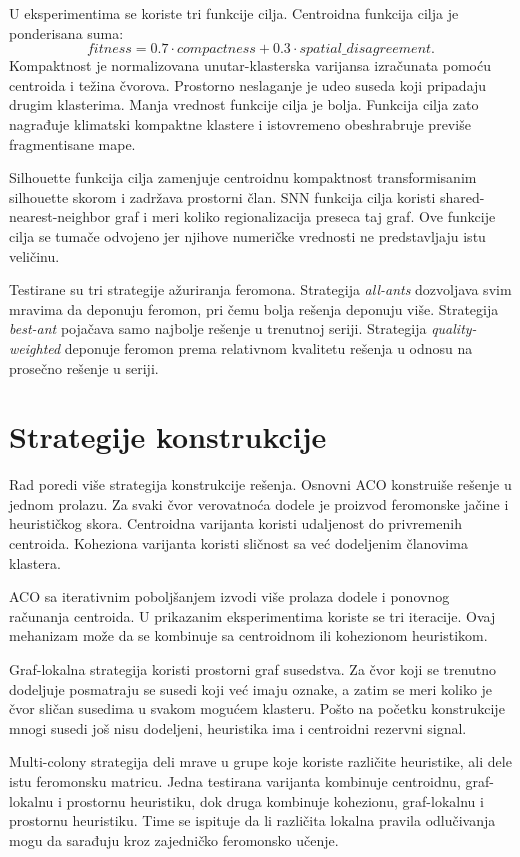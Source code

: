 \documentclass[11pt]{article}
\begin{document}
U eksperimentima se koriste tri funkcije cilja. Centroidna funkcija cilja je ponderisana suma:
\[
fitness = 0.7 \cdot compactness + 0.3 \cdot spatial\_disagreement.
\]
Kompaktnost je normalizovana unutar-klasterska varijansa izračunata pomoću centroida i težina čvorova. Prostorno neslaganje je udeo suseda koji pripadaju drugim klasterima. Manja vrednost funkcije cilja je bolja. Funkcija cilja zato nagrađuje klimatski kompaktne klastere i istovremeno obeshrabruje previše fragmentisane mape.

Silhouette funkcija cilja zamenjuje centroidnu kompaktnost transformisanim silhouette skorom i zadržava prostorni član. SNN funkcija cilja koristi shared-nearest-neighbor graf i meri koliko regionalizacija preseca taj graf. Ove funkcije cilja se tumače odvojeno jer njihove numeričke vrednosti ne predstavljaju istu veličinu.

Testirane su tri strategije ažuriranja feromona. Strategija \textit{all-ants} dozvoljava svim mravima da deponuju feromon, pri čemu bolja rešenja deponuju više. Strategija \textit{best-ant} pojačava samo najbolje rešenje u trenutnoj seriji. Strategija \textit{quality-weighted} deponuje feromon prema relativnom kvalitetu rešenja u odnosu na prosečno rešenje u seriji.

\section*{Strategije konstrukcije}

Rad poredi više strategija konstrukcije rešenja. Osnovni ACO konstruiše rešenje u jednom prolazu. Za svaki čvor verovatnoća dodele je proizvod feromonske jačine i heurističkog skora. Centroidna varijanta koristi udaljenost do privremenih centroida. Koheziona varijanta koristi sličnost sa već dodeljenim članovima klastera.

ACO sa iterativnim poboljšanjem izvodi više prolaza dodele i ponovnog računanja centroida. U prikazanim eksperimentima koriste se tri iteracije. Ovaj mehanizam može da se kombinuje sa centroidnom ili kohezionom heuristikom.

Graf-lokalna strategija koristi prostorni graf susedstva. Za čvor koji se trenutno dodeljuje posmatraju se susedi koji već imaju oznake, a zatim se meri koliko je čvor sličan susedima u svakom mogućem klasteru. Pošto na početku konstrukcije mnogi susedi još nisu dodeljeni, heuristika ima i centroidni rezervni signal.

Multi-colony strategija deli mrave u grupe koje koriste različite heuristike, ali dele istu feromonsku matricu. Jedna testirana varijanta kombinuje centroidnu, graf-lokalnu i prostornu heuristiku, dok druga kombinuje kohezionu, graf-lokalnu i prostornu heuristiku. Time se ispituje da li različita lokalna pravila odlučivanja mogu da sarađuju kroz zajedničko feromonsko učenje.
\end{document}
